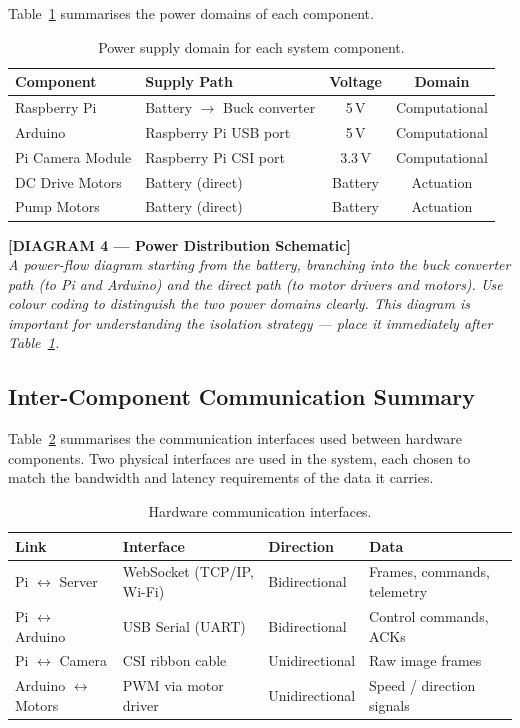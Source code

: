 Table~\ref{tab:power} summarises the power domains of each component.
 
\begin{table}[h]
\centering
\caption{Power supply domain for each system component.}
\label{tab:power}
\begin{tabular}{llcc}
\hline
\textbf{Component} & \textbf{Supply Path} & \textbf{Voltage} & \textbf{Domain} \\
\hline
Raspberry Pi     & Battery $\to$ Buck converter & 5\,V  & Computational \\
Arduino          & Raspberry Pi USB port         & 5\,V  & Computational \\
Pi Camera Module & Raspberry Pi CSI port         & 3.3\,V & Computational \\
DC Drive Motors  & Battery (direct)              & Battery & Actuation \\
Pump Motors      & Battery (direct)              & Battery & Actuation \\
\hline
\end{tabular}
\end{table}
 
\bigskip
\noindent\textbf{[DIAGRAM 4 — Power Distribution Schematic]}\\
\textit{A power-flow diagram starting from the battery, branching
into the buck converter path (to Pi and Arduino) and the direct path
(to motor drivers and motors). Use colour coding to distinguish the
two power domains clearly. This diagram is important for
understanding the isolation strategy — place it immediately after
Table~\ref{tab:power}.}
\bigskip
 
\subsection{Inter-Component Communication Summary}
 
Table~\ref{tab:comms} summarises the communication interfaces used
between hardware components. Two physical interfaces are used in the
system, each chosen to match the bandwidth and latency requirements
of the data it carries.
 
\begin{table}[h]
\centering
\caption{Hardware communication interfaces.}
\label{tab:comms}
\begin{tabular}{llll}
\hline
\textbf{Link} & \textbf{Interface} & \textbf{Direction} & \textbf{Data} \\
\hline
Pi $\leftrightarrow$ Server  & WebSocket (TCP/IP, Wi-Fi) & Bidirectional & Frames, commands, telemetry \\
Pi $\leftrightarrow$ Arduino & USB Serial (UART)         & Bidirectional & Control commands, ACKs \\
Pi $\leftrightarrow$ Camera  & CSI ribbon cable          & Unidirectional & Raw image frames \\
Arduino $\leftrightarrow$ Motors & PWM via motor driver & Unidirectional & Speed / direction signals \\
\hline
\end{tabular}
\end{table}
 
